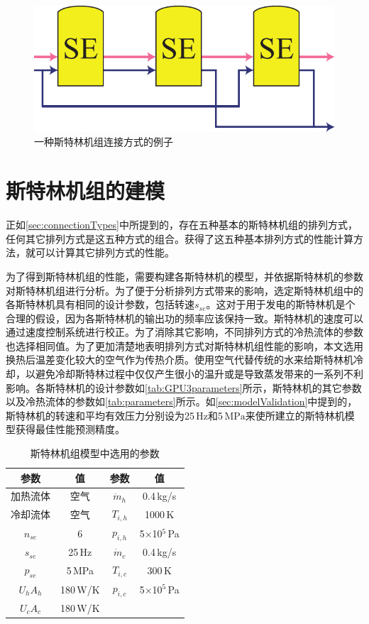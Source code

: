 \begin{figure}[htbp]
\centering
	\includegraphics[width = 0.3\columnwidth]{fig/SEA_eg}
	\caption{一种斯特林机组连接方式的例子}
	\label{fig:SEA_eg}
\end{figure}

\section{斯特林机组的建模}

正如\autoref{sec:connectionTypes}中所提到的，存在五种基本的斯特林机组的排列方式，任何其它排列方式是这五种方式的组合。获得了这五种基本排列方式的性能计算方法，就可以计算其它排列方式的性能。

为了得到斯特林机组的性能，需要构建各斯特林机的模型，并依据斯特林机的参数对斯特林机组进行分析。为了便于分析排列方式带来的影响，选定斯特林机组中的各斯特林机具有相同的设计参数，包括转速$s_{se}$。这对于用于发电的斯特林机是个合理的假设，因为各斯特林机的输出功的频率应该保持一致。斯特林机的速度可以通过速度控制系统进行校正\cite{Hooshang2016}。为了消除其它影响，不同排列方式的冷热流体的参数也选择相同值。为了更加清楚地表明排列方式对斯特林机组性能的影响，本文选用换热后温差变化较大的空气作为传热介质。使用空气代替传统的水来给斯特林机冷却，以避免冷却斯特林过程中仅仅产生很小的温升或是导致蒸发带来的一系列不利影响。各斯特林机的设计参数如\autoref{tab:GPU3parameters}所示，斯特林机的其它参数以及冷热流体的参数如\autoref{tab:parameters}所示。如\autoref{sec:modelValidation}中提到的，斯特林机的转速和平均有效压力分别设为25$\,\mathrm{Hz}$和5$\,\mathrm{MPa}$来使所建立的斯特林机模型获得最佳性能预测精度。

\begin{table}[htbp]
\setlength{\abovecaptionskip}{0pt}
	\caption{斯特林机组模型中选用的参数}
	\centering
	\begin{tabular}{cccc}
		\toprule
		参数		&	值	& 参数	&	值\\
		\midrule
		加热流体	&	空气		&	$\dot{m}_h$	&	0.4\,kg/s\\
		冷却流体	&	空气	&	$T_{i,h}$	&	1000\,K\\
		$n_{se}$	&	6	&	$p_{i,h}$	&	5$\times$10$^5$\,Pa\\
		$s_{se}$	&	25\,Hz	&	$\dot{m}_c$	&	0.4\,kg/s\\
		$p_{se}$		&	5\,MPa	&	$T_{i,c}$	&	300\,K\\
		$U_hA_h$	&	180\,W/K	&	$p_{i,c}$	&	5$\times$10$^5$\,Pa\\
		$U_cA_c$		&	180\,W/K	&&\\
		\bottomrule
	\end{tabular}
	\label{tab:parameters}
\end{table}

